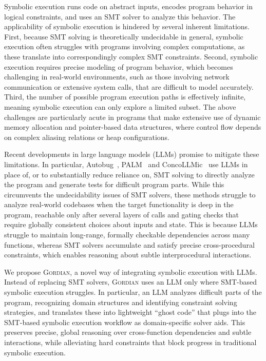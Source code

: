\documentclass[acmsmall,screen,nonacm]{acmart}
\newcommand{\projName}{\textsc{Gordian}\xspace}
\theoremstyle{definition}
\begin{document}
Symbolic execution runs code on abstract inputs, encodes program behavior in logical constraints, and uses an SMT solver to analyze this behavior. The applicability of symbolic execution is hindered by several inherent limitations. First, because SMT solving is theoretically undecidable in general, symbolic execution often struggles with programs involving complex computations, as these translate into correspondingly complex SMT constraints. Second, symbolic execution requires precise modeling of program behavior, which becomes challenging in real-world environments, such as those involving network communication or extensive system calls, that are difficult to model accurately. Third, the number of possible program execution paths is effectively infinite, meaning symbolic execution can only explore a limited subset. The above challenges are particularly acute in programs that make extensive use of dynamic memory allocation and pointer-based data structures, where control flow depends on complex aliasing relations or heap configurations.

Recent developments in large language models (LLMs) promise to mitigate these limitations. In particular, Autobug~\cite{autobug}, PALM~\cite{palm} and ConcoLLMic~\cite{concollmic} use LLMs in place of, or to substantially reduce reliance on, SMT solving to directly analyze the program and generate tests for difficult program parts. While this circumvents the undecidability issues of SMT solvers, these methods struggle to analyze real-world codebases when the target functionality is deep in the program,  reachable only after several layers of calls and gating checks that require globally consistent choices about inputs and state. This is because LLMs struggle to maintain long-range, formally checkable dependencies across many functions, whereas SMT solvers accumulate and satisfy precise cross-procedural constraints, which enables reasoning about subtle interprocedural interactions.

We propose \projName, a novel way of integrating symbolic execution with LLMs. Instead of replacing SMT solvers, \projName uses an LLM only where SMT-based symbolic execution struggles. In particular, an LLM analyzes difficult parts of the program, recognizing domain structures and identifying constraint solving strategies, and translates these into lightweight ``ghost code'' that plugs into the SMT-based symbolic execution workflow as domain-specific solver aids. This preserves precise, global reasoning over cross-function dependencies and subtle interactions, while alleviating hard constraints that block progress in traditional symbolic execution.
\end{document}
